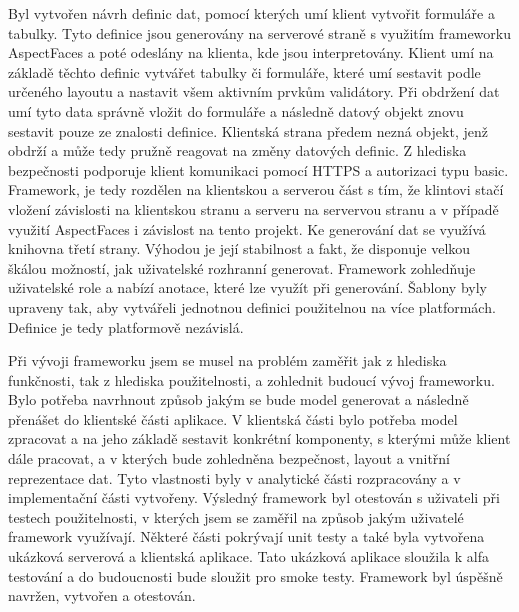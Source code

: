 Byl vytvořen návrh definic dat, pomocí kterých umí klient vytvořit formuláře a tabulky. Tyto definice jsou generovány na serverové straně s využitím frameworku AspectFaces a poté odeslány na klienta, kde jsou interpretovány. Klient umí na základě těchto definic vytvářet tabulky či formuláře, které umí sestavit podle určeného layoutu a nastavit všem aktivním prvkům validátory. Při obdržení dat umí tyto data správně vložit do formuláře a následně datový objekt znovu sestavit pouze ze znalosti definice. Klientská strana předem nezná objekt, jenž obdrží a může tedy pružně reagovat na změny datových definic. Z hlediska bezpečnosti podporuje klient komunikaci pomocí HTTPS a autorizaci typu basic. Framework, je tedy rozdělen na klientskou a serverou část s tím, že klintovi stačí vložení závislosti na klientskou stranu a serveru na servervou stranu a v případě využití AspectFaces i závislost na tento projekt. Ke generování dat se využívá knihovna třetí strany. Výhodou je její stabilnost a fakt, že disponuje velkou škálou možností, jak uživatelské rozhranní generovat. Framework zohledňuje uživatelské role a nabízí anotace, které lze využít při generování. Šablony byly upraveny tak, aby vytvářeli jednotnou definici použitelnou na více platformách. Definice je tedy platformově nezávislá. 

Při vývoji frameworku jsem se musel na problém zaměřit jak z hlediska funkčnosti, tak z hlediska použitelnosti, a zohlednit budoucí vývoj frameworku. Bylo potřeba navrhnout způsob jakým se bude model generovat a následně přenášet do klientské části aplikace. V klientská části bylo potřeba model zpracovat a na jeho základě sestavit konkrétní komponenty, s kterými může klient dále pracovat, a v kterých bude zohledněna bezpečnost, layout a vnitřní reprezentace dat. Tyto vlastnosti byly v analytické části rozpracovány a v implementační části vytvořeny. Výsledný framework byl otestován s uživateli při testech použitelnosti, v kterých jsem se zaměřil na způsob jakým uživatelé framework využívají. Některé části pokrývají unit testy a také byla vytvořena ukázková serverová a klientská aplikace. Tato ukázková aplikace sloužila k alfa testování a do budoucnosti bude sloužit pro smoke testy. Framework byl úspěšně navržen, vytvořen a otestován.



